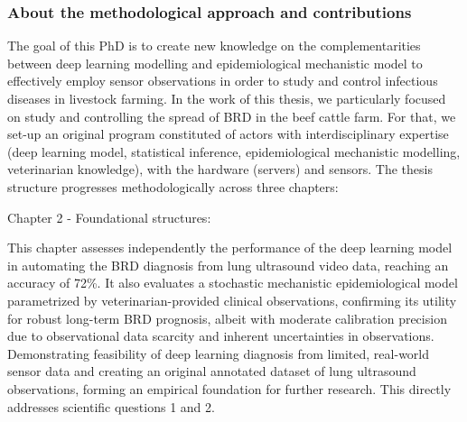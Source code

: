 \subsubsection{About the methodological approach and contributions}


The goal of this PhD is to create new knowledge on the complementarities between deep learning modelling and epidemiological mechanistic model to effectively employ sensor observations in order to study and control infectious diseases in livestock farming. In the work of this thesis, we particularly focused on study and controlling the spread of BRD in the beef cattle farm. For that, we set-up an original program constituted of actors with interdisciplinary expertise (deep learning model, statistical inference, epidemiological mechanistic modelling, veterinarian knowledge), with the hardware (servers) and sensors. The thesis structure progresses methodologically across three chapters:




Chapter 2 - Foundational structures:


This chapter assesses independently the performance of the deep learning model in automating the BRD diagnosis from lung ultrasound video data, reaching an accuracy of 72\%. It also evaluates a stochastic mechanistic epidemiological model parametrized by veterinarian-provided clinical observations, confirming its utility for robust long-term BRD prognosis, albeit with moderate calibration precision due to observational data scarcity and inherent uncertainties in observations. Demonstrating feasibility of deep learning diagnosis from limited, real-world sensor data and creating an original annotated dataset of lung ultrasound observations, forming an empirical foundation for further research. This directly addresses scientific questions 1 and 2.

